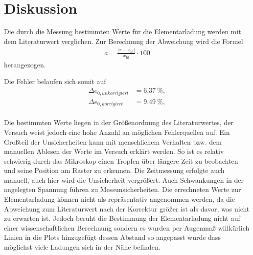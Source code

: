 \section{Diskussion}
\label{sec:Diskussion}
Die durch die Messung bestimmten Werte für die Elementarladung werden mit dem Literaturwert \cite{Elementarladung}
verglichen. 
Zur Berechnung der Abweichung wird die Formel 
\begin{align*}
    a=\frac{|x-x_{\text{lit}}|}{x_{\text{lit}}}\cdot 100 \label{eqn:abweich}
\end{align*}
herangezogen.

Die Fehler belaufen sich somit auf
\begin{align*}
    \Delta e_{0,unkorrigiert}&= \qty{6.37}{\percent},\\
    \Delta e_{0,korrigiert}&= \qty{9.49}{\percent},\\
\end{align*}

Die bestimmten Werte liegen in der Größenordnung des Literaturwertes, der Versuch weist jedoch eine hohe Anzahl an möglichen Fehlerquellen auf.
Ein Großteil der Unsicherheiten kann mit menschlichem Verhalten bzw.
dem manuellen Ablesen der Werte im Versuch erklärt werden.
So ist es relativ schwierig durch das Mikroskop einen Tropfen über längere Zeit zu beobachten und seine Position am Raster zu erkennen.
Die Zeitmessung erfolgte auch manuell, auch hier wird die Unsicherheit vergrößert.
Auch Schwankungen in der angelegten Spannung führen zu Messunsicherheiten.
Die errechneten Werte zur Elementarladung können nicht als repräsentativ angenommen werden, da die Abweichung zum Literaturwert
nach der Korrektur größer ist als davor, was nicht zu erwarten ist.
Jedoch beruht die Bestimmung der Elementarladung nicht auf einer wissenschaftlichen Berechnung sondern es wurden per Augenmaß willkürlich Linien
in die Plots hinzugefügt dessen Abstand so angepasst wurde dass möglichst viele Ladungen sich in der Nähe befinden.

